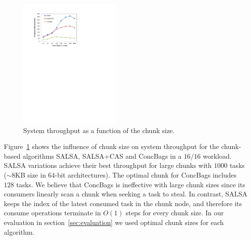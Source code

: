 \begin{figure}[htb]
 \begin{center}
   \includegraphics[width=0.45\textwidth]{figures/chunk-size}
 \end{center}
	\caption{\footnotesize{System throughput as a function of the chunk size. }}
	\label{fig:chunk-size}
\end{figure}
Figure~\ref{fig:chunk-size} shows the influence of chunk size on system throughput for the chunk-based algorithms SALSA, SALSA+CAS and ConcBags in a $16/16$ workload. 
SALSA variations achieve their best throughput for large chunks with $1000$ tasks ($\sim8$KB size in $64$-bit architectures). The optimal chunk for ConcBags includes $128$ tasks. We believe that ConcBags is ineffective with large chunk sizes since its consumers linearly scan a chunk when seeking a task to steal. In contrast, SALSA keeps the index of the latest consumed task in the chunk node, and therefore its consume operations terminate in $O(1)$ steps for every chunk size. 
In our evaluation in section~\ref{sec:evaluation} we used optimal chunk sizes for each algorithm. 
